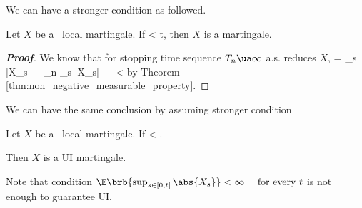 We can have a stronger condition as followed.

\begin{corollary}\label{cor:local_martingale_expected_sup_compact_martingale}
Let $X$ be a \cadlag\ local martingale. If
\be
\E{} < \infty\quad{}t,
\ee
then $X$ is a martingale.
\end{corollary}

%

\begin{proof}[\bf Proof]
We know that for stopping time sequence $T_n \ua \infty$ a.s. reduces $X$,
\be
{} =  \leq \sup_{s\in[0,t]} |X_s|  \ \ra\ \sup_{n} \leq \sup_{s\in[0,t]} |X_s| \ \ra\  \E{} \leq  \E{} < \infty
\ee
by Theorem \ref{thm:non_negative_measurable_property}.
\end{proof}

We can have the same conclusion by assuming stronger condition

\begin{corollary}\label{cor:local_martingale_expected_sup_martingale}
Let $X$ be a \cadlag\ local martingale. If
\be
\E{} < \infty.
\ee

Then $X$ is a UI martingale.
\end{corollary}

\begin{remark}
Note that condition $\E\brb{\sup_{s\in[0,t]} \abs{X_s}} < \infty\quad\text{ for every }t$ is not enough to guarantee UI.
\end{remark}


